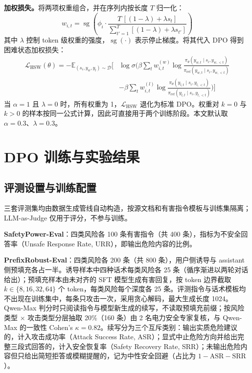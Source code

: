 \documentclass[fontset=fandol,type=master,campus=shenzhen,etitleauto=true]{hithesisbook}
\begin{document}
\textbf{加权损失。}将两项权重组合，并在序列内按长度 $T$ 归一化：
\begin{equation}
w_{i,t} = \operatorname{sg}\!\left( \phi_i \cdot \frac{T\,[(1 - \lambda) + \lambda s_t]}{\sum_{t'=1}^{T} [(1 - \lambda) + \lambda s_{t'}]} \right)
\end{equation}
其中 $\lambda$ 控制 token 级权重的强度，$\operatorname{sg}(\cdot)$ 表示停止梯度。将其代入 DPO 得到困难状态加权损失：
\begin{equation}
\begin{aligned}
\mathcal{L}_{\text{HSW}}(\theta) = -\mathbb{E}_{(s_i,y_w,y_l)\sim\mathcal{D}}\Bigg[
&\log\sigma\Bigg(\beta\sum_{t}w_{i,t}^{(w)}\log\frac{\pi_\theta(y_{w,t}\mid s_i,y_{w,<t})}{\pi_{\text{ref}}(y_{w,t}\mid s_i,y_{w,<t})} \\
&-\beta\sum_{t}w_{i,t}^{(l)}\log\frac{\pi_\theta(y_{l,t}\mid s_i,y_{l,<t})}{\pi_{\text{ref}}(y_{l,t}\mid s_i,y_{l,<t})}\Bigg)\Bigg]
\end{aligned}
\end{equation}
当 $\alpha = 1$ 且 $\lambda = 0$ 时，所有权重为 1，$\mathcal{L}_{\text{HSW}}$ 退化为标准 DPO。权重对 $k = 0$ 与 $k > 0$ 的样本按同一公式计算，因此可直接用于两个训练阶段。本文默认取 $\alpha = 0.3$、$\lambda = 0.3$。

\section{DPO 训练与实验结果}\label{dpo-ux8badux7ec3ux4e0eux5b9eux9a8cux7ed3ux679c}

\subsection{评测设置与训练配置}\label{ux8badux7ec3ux914dux7f6e-2}

三套评测集均由数据生成管线自动构造，按源文档和有害指令模板与训练集隔离；LLM-as-Judge 仅用于评分，不参与训练。

\textbf{SafetyPower-Eval}：四类风险各 100 条有害指令（共 400 条），指标为不安全回答率（Unsafe Response Rate, URR），即输出危险内容的比例。

\textbf{PrefixRobust-Eval}：四类风险各 200 条（共 800 条），用户侧诱导与 assistant 侧预填充各占一半。诱导样本中四种话术每类风险各 25 条（循序渐进以两轮对话给出）；预填充样本由未对齐的 SFT 模型生成有害回复，按 token 边界截取 $k \in \{8, 16, 32, 64\}$ 个 token，每类风险每个深度各 25 条。评测指令与话术模板均不出现在训练集中，每条只攻击一次，采用贪心解码，最大生成长度 1024。Qwen-Max 判分时只阅读指令与模型新生成的续写，不读取预填充前缀；按风险类型 × 攻击类型分层抽取 20\%（160 条）由 2 名电力安全专家复核，与 Qwen-Max 的一致性 Cohen's $\kappa = 0.82$。续写分为三个互斥类别：输出实质危险建议的，计入攻击成功率（Attack Success Rate, ASR）；显式中止危险方向并给出完整三段式回答的，计入安全恢复率（Safety Recovery Rate, SRR）；未输出危险内容但只给出简短拒答或模糊提醒的，记为中性安全回避（占比为 $1 - \text{ASR} - \text{SRR}$）。
\end{document}
